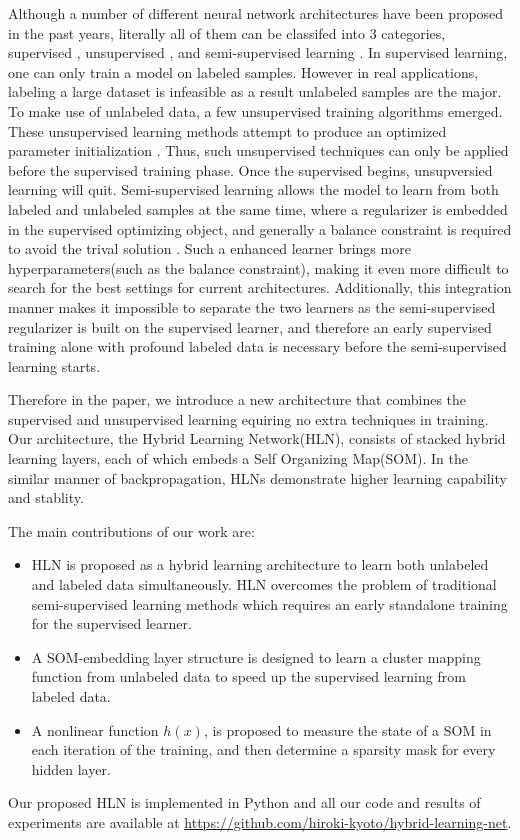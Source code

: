\documentclass[3p,times,procedia]{elsarticle}
\begin{document}
Although a number of
different neural network architectures
have been proposed in the past years,
literally all of them can be classifed
into 3 categories, supervised
\cite{lecun1990handwritten}, 
unsupervised
\cite{vincent2010stacked}, 
and semi-supervised learning
\cite{chapelle2009semi}.
In supervised learning, 
one can only train a model on
labeled samples. However in real 
applications, labeling a large 
dataset is infeasible as a result
unlabeled samples are 
the major. To make use of 
unlabeled data, a few 
unsupervised training algorithms 
emerged. These unsupervised learning
methods attempt to produce an optimized 
parameter initialization
\cite{le2013building}.
Thus, such unsupervised techniques 
can only be applied before the 
supervised training phase. Once 
the supervised begins, 
unsupversied learning will quit.
Semi-supervised learning
allows the model to learn from
both labeled and unlabeled samples
at the same time, where a
regularizer is embedded in
the supervised optimizing object,
and generally a balance constraint is
required to avoid the trival solution
\cite{socher2011semi}.
Such a enhanced learner brings more 
hyperparameters(such as the balance 
constraint), making it even more 
difficult to search for the best 
settings for current architectures. 
Additionally, this integration manner 
makes it impossible to separate the 
two learners as the semi-supervised 
regularizer is built on the supervised 
learner, and therefore an 
early supervised training alone with 
profound labeled data is necessary
before the semi-supervised learning 
starts.

Therefore in the paper, we introduce 
a new architecture that combines the
supervised and unsupervised learning
equiring no extra techniques in
training. Our architecture, the Hybrid
Learning Network(HLN), consists of 
stacked hybrid learning layers, 
each of which
embeds a Self Organizing
Map(SOM). In the similar manner of 
backpropagation, HLNs
demonstrate higher learning
capability and stablity. 

The main contributions of our work are:
\begin{itemize}
\item
	HLN is proposed as a hybrid learning
	architecture to learn both unlabeled 
		and labeled data simultaneously.
		HLN overcomes
the problem of traditional 
semi-supervised learning methods which 
requires
an early standalone training for the
supervised learner.
\item A SOM-embedding layer structure is 
	designed to learn a cluster 
mapping function from unlabeled data
		to speed up the supervised
		learning from labeled
data.
\item A nonlinear function $h(x)$,
	is proposed to 
		measure the state of a
		SOM in each iteration of the 
		training, and then determine 
		a sparsity
		mask for every hidden layer.
\end{itemize}
Our proposed HLN is implemented in 
Python and all
our code and results of experiments
are available at
\url{https://github.com/hiroki-kyoto/hybrid-learning-net}.
\end{document}
